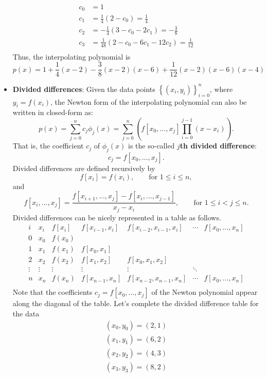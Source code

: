 \documentclass{report}
\begin{document}
\begin{itemize}
\begin{align*}
        c_0 &= 1 
        \\
        c_1 &= \frac{1}{4} (2 - c_0) = \frac{1}{4} 
        \\
        c_2 &= -\frac{1}{4}(3 - c_0 - 2 c_1) =  -\frac38
        \\
        c_3 &= \frac{1}{48}(2 - c_0 - 6 c_1 - 12 c_2) = \frac{1}{12}
        \\
    \end{align*}
    \bigbreak \noindent 
    Thus, the interpolating polynomial is 
    $$
    p(x) = 1 + \frac14(x-2) - \frac38(x-2)(x-6) + \frac{1}{12}(x-2)(x-6)(x-4)
    $$
\item \textbf{Divided differences}:
    Given the data points $\left\{(x_i,y_i)\right\}_{i=0}^n$, where $y_i = f(x_i)$, the Newton form of the interpolating polynomial can also be written in closed-form as:
$$p(x) = \sum_{j=0}^n c_j \phi_j(x) = \sum_{j=0}^n \left( f[x_0,\ldots,x_j] \prod_{i=0}^{j-1}(x-x_i) \right).$$
That is, the coefficient $c_j$ of $\phi_j(x)$ is the so-called \textbf{$j$th divided difference}:
$$c_j = f[x_0,\ldots,x_j].$$
Divided differences are defined recursively by
$$f[x_i] = f(x_i), \qquad \text{for } 1\leq i \leq n,$$
and
$$f[x_i,\ldots,x_j] = \frac{f[x_{i+1},\ldots,x_j] - f[x_i,\ldots,x_{j-1}]}{x_j - x_i}, \qquad \text{for } 1\leq i < j \leq n.$$
\bigbreak \noindent 
Divided differences can be nicely represented in a table as follows.
$$
\begin{array}{c||c|ccccc}
i & x_i & f[x_i] & f[x_{i-1},x_i] & f[x_{i-2},x_{i-1},x_i] & \cdots & f[x_0,\ldots,x_n] \\ \hline
0 & x_0 & f(x_0) \\
1 & x_1 & f(x_1) & f[x_0,x_1] \\
2 & x_2 & f(x_2) & f[x_1,x_2] & f[x_0,x_1,x_2] \\
\vdots & \vdots & \vdots & \vdots & \vdots & \ddots  \\
n & x_n & f(x_n) & f[x_{n-1},x_n] & f[x_{n-2},x_{n-1},x_n] & \cdots & f[x_0,\ldots,x_n] \\
\end{array}
$$
Note that the coefficients $c_j = f[x_0,\ldots,x_j]$ of the Newton polynomial appear along the diagonal of the table.
\bigbreak \noindent 
Let's complete the divided difference table for the data
\begin{align*}
    (x_0,y_0) = (2,1)\\
    (x_1,y_1) = (6,2)\\
    (x_2, y_2) = (4,3)\\
    (x_3, y_3) = (8,2)\\

\end{align*}
\end{itemize}
\end{document}
